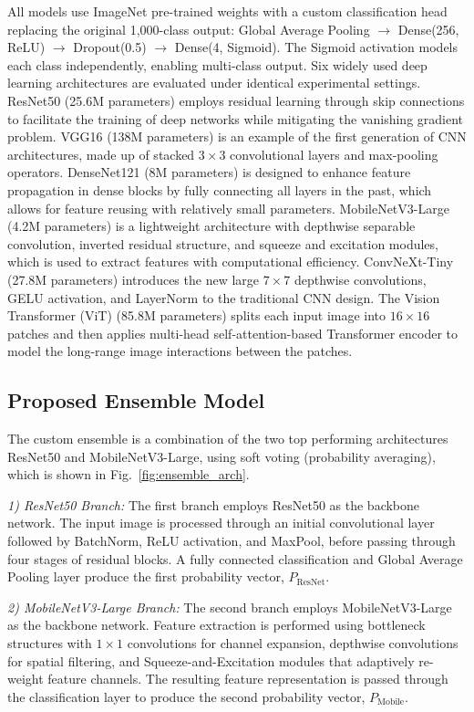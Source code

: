 \documentclass[conference]{IEEEtran}
\begin{document}
{{All models use ImageNet pre-trained weights with a custom classification head replacing the original 1,000-class output: Global Average Pooling $\rightarrow$ Dense(256, ReLU) $\rightarrow$ Dropout(0.5) $\rightarrow$ Dense(4, Sigmoid). The Sigmoid activation models each class independently, enabling multi-class output. Six widely used deep learning architectures are evaluated under identical experimental settings. ResNet50 (25.6M parameters) employs residual learning through skip connections to facilitate the training of deep networks while mitigating the vanishing gradient problem. VGG16 (138M parameters) is an example of the first generation of CNN architectures, made up of stacked $3\times3$ convolutional layers and max-pooling operators. DenseNet121 (8M parameters) is designed to enhance feature propagation in dense blocks by fully connecting all layers in the past, which allows for feature reusing with relatively small parameters. MobileNetV3-Large (4.2M parameters) is a lightweight architecture with depthwise separable convolution, inverted residual structure, and squeeze and excitation modules, which is used to extract features with computational efficiency. ConvNeXt-Tiny (27.8M parameters) introduces the new large $7\times7$ depthwise convolutions, GELU activation, and LayerNorm to the traditional CNN design. The Vision Transformer (ViT) (85.8M parameters) splits each input image into $16\times16$ patches and then applies multi-head self-attention-based Transformer encoder to model the long-range image interactions between the patches.


\subsection{Proposed Ensemble Model}

The custom ensemble is a combination of the two top performing architectures ResNet50 and MobileNetV3-Large, using soft voting (probability averaging), which is shown in Fig.~\ref{fig:ensemble_arch}.

{\textit{1) ResNet50 Branch:}} The first branch employs ResNet50 as the backbone network. The input image is processed through an initial convolutional layer followed by BatchNorm, ReLU activation, and MaxPool, before passing through four stages of residual blocks. A fully connected classification and Global Average Pooling layer produce the first probability vector, $P_{\text{ResNet}}$.

\textit{{2) MobileNetV3-Large Branch:}} The second branch employs MobileNetV3-Large as the backbone network. Feature extraction is performed using bottleneck structures with $1\times1$ convolutions for channel expansion, depthwise convolutions for spatial filtering, and Squeeze-and-Excitation modules that adaptively re-weight feature channels. The resulting feature representation is passed through the classification layer to produce the second probability vector, $P_{\text{Mobile}}$.

}}
\end{document}
